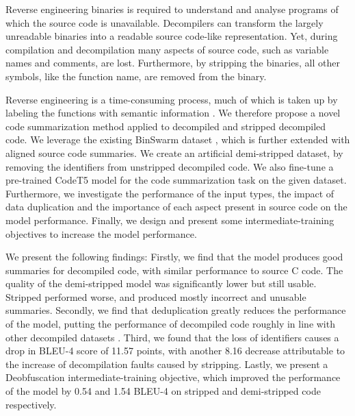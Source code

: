 Reverse engineering binaries is required to understand and analyse programs of which the source code is unavailable. Decompilers can transform the largely unreadable binaries into a readable source code-like representation. Yet, during compilation and decompilation many aspects of source code, such as variable names and comments, are lost. Furthermore, by stripping the binaries, all other symbols, like the function name, are removed from the binary.

Reverse engineering is a time-consuming process, much of which is taken up by labeling the functions with semantic information \cite{reverseEngineerProcess}. We therefore propose a novel code summarization method applied to decompiled and stripped decompiled code. We leverage the existing BinSwarm dataset \cite{InlinedFunc}, which is further extended with aligned source code summaries. We create an artificial demi-stripped dataset, by removing the identifiers from unstripped decompiled code. We also fine-tune a pre-trained CodeT5 model for the code summarization task on the given dataset. Furthermore, we investigate the performance of the input types, the impact of data duplication and the importance of each aspect present in source code on the model performance. Finally, we design and present some intermediate-training objectives to increase the model performance.

We present the following findings: Firstly, we find that the model produces good summaries for decompiled code, with similar performance to source C code. The quality of the demi-stripped model was significantly lower but still usable. Stripped performed worse, and produced mostly incorrect and unusable summaries. Secondly, we find that deduplication greatly reduces the performance of the model, putting the performance of decompiled code roughly in line with other decompiled datasets \cite{CodeT5}. Third, we found that the loss of identifiers causes a drop in BLEU-4 score of 11.57 points, with another 8.16 decrease attributable to the increase of decompilation faults caused by stripping. Lastly, we present a Deobfuscation intermediate-training objective, which improved the performance of the model by 0.54 and 1.54  BLEU-4 on stripped and demi-stripped code respectively. 